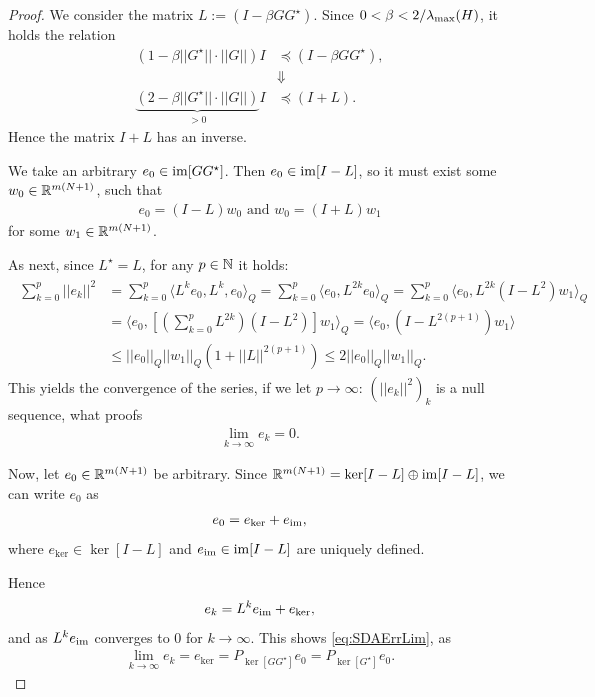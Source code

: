 \begin{proof}
	We consider the matrix $L:= ( I -\beta G G^\star)$. Since $0 <\beta < 2/\lambda_{\mathrm{max}}(H)$, it holds the relation
	\begin{align}
	(1 - \beta || G^\star || \cdot || G || )I &\preceq (I - \beta G G^\star),\\
	&\Downarrow\\
	\label{eq:alg:proof1}
	\underbrace{(2 - \beta || G^\star || \cdot || G || )}_{> 0} I &\preceq (I + L).
	\end{align}
	Hence the matrix $I + L$ has an inverse.
	 
	We take an arbitrary $e_0 \in \operatorname{im} [G G^\star]$. Then $e_0 \in \operatorname{im} [I - L]$, so it must exist some $w_0 \in {\mathbb{R}}^{m (N+1)}$, such that 
	\begin{align}
	e_0 = (I - L)w_0 \text{ and } w_0 = (I + L)w_1
	\end{align}
	for some $w_1 \in {\mathbb{R}}^{m(N+1)}$. 
	
	As next, since $L^\star = L$, for any $p \in {\mathbb{N}}$ it holds: 
	\begin{align}
\begin{split}
	\sum_{k = 0}^p ||e_k||^2 &= \sum_{k = 0}^p \langle L^k e_0, L^k, e_0  \rangle_Q = \sum_{k = 0}^p\langle e_0 , L^{2k}e_0\rangle_Q = \sum_{k = 0}^p \langle e_0, L^{2k} (I - L^2) w_1 \rangle_Q \\
	&= \langle e_0, \left[\left(\sum_{k = 0}^p L^{2k}\right) (I - L^2)\right]w_1\rangle_Q = \langle e_0 , \left( I - L^{2(p+1)}\right)w_1\rangle \\
	&\leq ||e_0||_Q ||w_1||_Q \left(1 + ||L||^{2(p+1)}\right) \leq 2 ||e_0||_Q ||w_1||_Q.
\end{split}	\end{align}
This yields the convergence of the series, if we let  $p \to \infty$: $\left(||e_k||^2\right)_k$ is a null sequence, what proofs  
	\begin{align}
	\lim_{k \to \infty}e_k = 0.
	\end{align}
	
	Now, let $e_0 \in {\mathbb{R}}^{m(N+1)}$ be arbitrary. Since ${\mathbb{R}}^{m ( N+1)} = \ker [I - L] \oplus \operatorname{im} [I - L]$, we can write $e_0$ as 
	\begin{align}
	e_0 = e_{\ker} + e_{\operatorname{im}},
	\end{align}
	where $e_{\ker} \in \ker [I - L]$ and $e_{\operatorname{im}} \in \operatorname{im} [I - L]$ are uniquely defined.
	
	Hence 
	\begin{align}
	e_k = L^ke_{\operatorname{im}} + e_{\ker},
	\end{align}
	and as $L^ke_{\operatorname{im}}$ converges to 0 for $k \to \infty$.
	This shows \eqref{eq:SDAErrLim}, as  
	\begin{align}
	\lim_{k \to \infty} e_k = e_{\ker} = P_{\ker[GG^\star]}e_0 = P_{\ker[G^\star]}e_0.
	\end{align}	
\end{proof}


